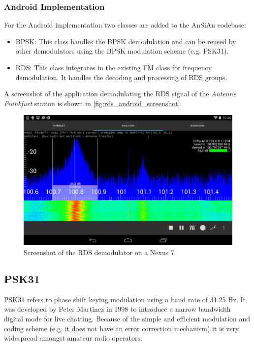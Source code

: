 \subsubsection{Android Implementation}

For the Android implementation two classes are added to the AnSiAn codebase:
\begin{itemize}
	\item BPSK: This class handles the \ac{BPSK} demodulation and can be
		reused by other demodulators using the \ac{BPSK} modulation scheme
		(e.g. PSK31).
	\item RDS: This class integrates in the existing FM class for frequency
		demodulation. It handles the decoding and processing of \ac{RDS}
		groups. 
\end{itemize}

A screenshot of the application demodulating the \ac{RDS} signal of the
\emph{Antenne Frankfurt} station is shown in \autoref{fig:rds_android_screenshot}.

\begin{figure}
	\centering
	\includegraphics[width=1\linewidth]{gfx/rds/android_screenshot.png}
	\caption{Screenshot of the RDS demodulator on a Nexus 7}
	\label{fig:rds_android_screenshot}
\end{figure}


\subsection{PSK31\label{sec:psk31}}

\ac{PSK31} refers to phase shift keying modulation using a baud rate of 31.25
Hz.  It was developed by Peter Martinez in 1998 to introduce a narrow bandwidth
digital mode for live chatting. Because of the simple and efficient modulation
and coding scheme (e.g. it does not have an error correction mechanism) it is
very widespread amongst amateur radio operators.

